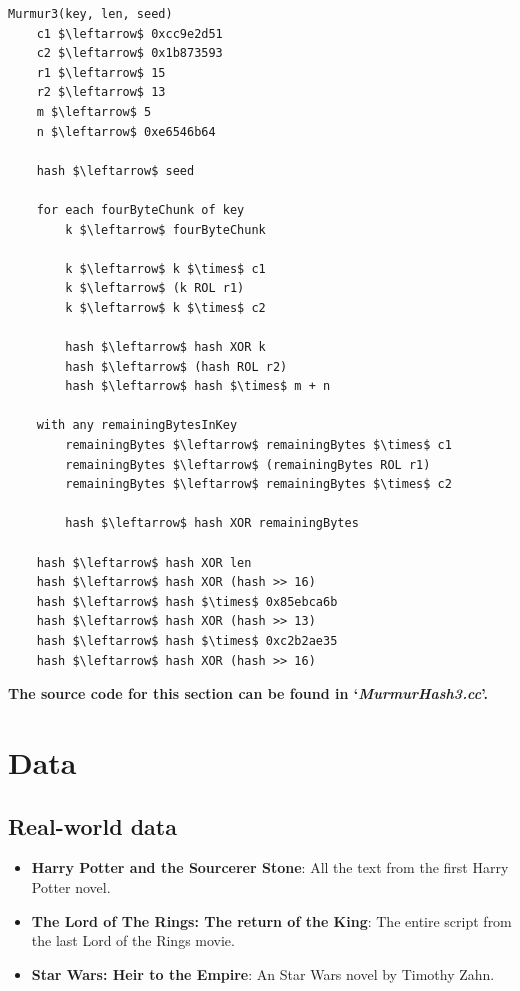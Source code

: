 \documentclass[12pt]{article}
\begin{document}
\begin{lstlisting}[mathescape=true]
Murmur3(key, len, seed)
    c1 $\leftarrow$ 0xcc9e2d51
    c2 $\leftarrow$ 0x1b873593
    r1 $\leftarrow$ 15
    r2 $\leftarrow$ 13
    m $\leftarrow$ 5
    n $\leftarrow$ 0xe6546b64
 
    hash $\leftarrow$ seed

    for each fourByteChunk of key
        k $\leftarrow$ fourByteChunk

        k $\leftarrow$ k $\times$ c1
        k $\leftarrow$ (k ROL r1)
        k $\leftarrow$ k $\times$ c2

        hash $\leftarrow$ hash XOR k
        hash $\leftarrow$ (hash ROL r2)
        hash $\leftarrow$ hash $\times$ m + n

    with any remainingBytesInKey
        remainingBytes $\leftarrow$ remainingBytes $\times$ c1
        remainingBytes $\leftarrow$ (remainingBytes ROL r1)
        remainingBytes $\leftarrow$ remainingBytes $\times$ c2

        hash $\leftarrow$ hash XOR remainingBytes
 
    hash $\leftarrow$ hash XOR len
    hash $\leftarrow$ hash XOR (hash >> 16)
    hash $\leftarrow$ hash $\times$ 0x85ebca6b
    hash $\leftarrow$ hash XOR (hash >> 13)
    hash $\leftarrow$ hash $\times$ 0xc2b2ae35
    hash $\leftarrow$ hash XOR (hash >> 16)

\end{lstlisting}

\textbf{The source code for this section can be found in `\textit{MurmurHash3.cc}'.}
\bigskip

\section{Data} %

\subsection{Real-world data}
\begin{itemize}
\item \textbf{Harry Potter and the Sourcerer Stone}: All the text from the first Harry Potter novel.
\item \textbf{The Lord of The Rings: The return of the King}: The entire script from the last Lord of the Rings movie.
\item \textbf{Star Wars: Heir to the Empire}:  An Star Wars novel by Timothy Zahn. 
\end{itemize}
\end{document}
